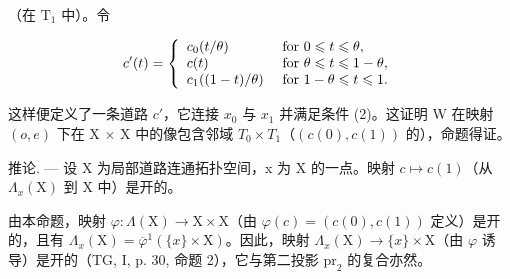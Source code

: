 （在 \(\mathrm{T}_1\) 中）。令

\[
c ^ {\prime} (t) = \left\{ \begin{array}{l l} c _ {0} (t / \theta) & \text { for } 0 \leqslant t \leqslant \theta , \\ c (t) & \text { for } \theta \leqslant t \leqslant 1 - \theta , \\ c _ {1} ((1 - t) / \theta) & \text { for } 1 - \theta \leqslant t \leqslant 1. \end{array} \right.
\]

这样便定义了一条道路 \(c'\)，它连接 \(x_{0}\) 与 \(x_{1}\) 并满足条件 (2)。这证明 W 在映射 \((o, e)\) 下在 X × X 中的像包含邻域 \(T_{0} \times T_{1}\)（\((c(0), c(1))\) 的），命题得证。

推论. --- 设 X 为局部道路连通拓扑空间，x 为 X 的一点。映射 \(c \mapsto c(1)\)（从 \(\Lambda_{x}(\mathrm{X})\) 到 X 中）是开的。

由本命题，映射 \(\varphi\colon\Lambda(\mathrm{X})\to\mathrm{X}\times\mathrm{X}\)（由 \(\varphi(c)=(c(0),c(1))\) 定义）是开的，且有 \(\Lambda_{x}(\mathrm{X})=\overline{\varphi}^{1}(\{x\}\times\mathrm{X})\)。因此，映射 \(\Lambda_{x}(\mathrm{X})\to\{x\}\times\mathrm{X}\)（由 \(\varphi\) 诱导）是开的（TG, I, p. 30, 命题 2），它与第二投影 \(\mathrm{pr}_{2}\) 的复合亦然。

